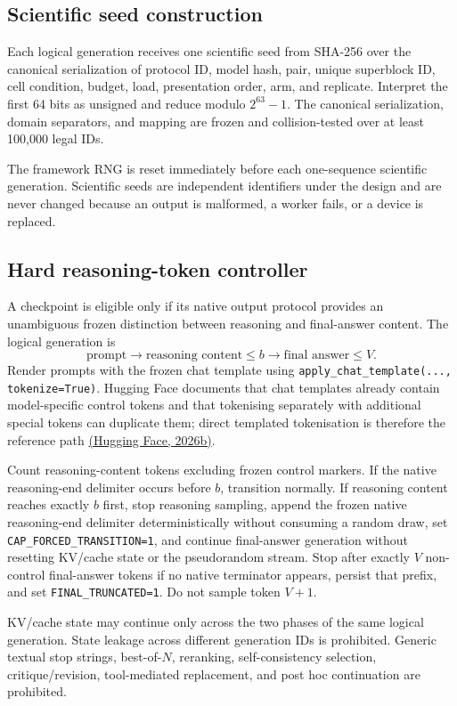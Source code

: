 \documentclass[11pt,a4paper]{article}
\begin{document}
\subsection{Scientific seed construction}
Each logical generation receives one scientific seed from SHA-256 over the canonical serialization of protocol ID, model hash, pair, unique superblock ID, cell condition, budget, load, presentation order, arm, and replicate. Interpret the first 64 bits as unsigned and reduce modulo $2^{63}-1$. The canonical serialization, domain separators, and mapping are frozen and collision-tested over at least 100,000 legal IDs.

The framework RNG is reset immediately before each one-sequence scientific generation. Scientific seeds are independent identifiers under the design and are never changed because an output is malformed, a worker fails, or a device is replaced.

\subsection{Hard reasoning-token controller}
A checkpoint is eligible only if its native output protocol provides an unambiguous frozen distinction between reasoning and final-answer content. The logical generation is
\[
\text{prompt}\to \text{reasoning content}\le b\to \text{final answer}\le V.
\]
Render prompts with the frozen chat template using \texttt{apply\_chat\_template(..., tokenize=True)}. Hugging Face documents that chat templates already contain model-specific control tokens and that tokenising separately with additional special tokens can duplicate them; direct templated tokenisation is therefore the reference path \href{https://huggingface.co/docs/transformers/main/chat_templating}{(Hugging Face, 2026b)}.

Count reasoning-content tokens excluding frozen control markers. If the native reasoning-end delimiter occurs before $b$, transition normally. If reasoning content reaches exactly $b$ first, stop reasoning sampling, append the frozen native reasoning-end delimiter deterministically without consuming a random draw, set \texttt{CAP\_FORCED\_TRANSITION=1}, and continue final-answer generation without resetting KV/cache state or the pseudorandom stream. Stop after exactly $V$ non-control final-answer tokens if no native terminator appears, persist that prefix, and set \texttt{FINAL\_TRUNCATED=1}. Do not sample token $V+1$.

KV/cache state may continue only across the two phases of the same logical generation. State leakage across different generation IDs is prohibited. Generic textual stop strings, best-of-$N$, reranking, self-consistency selection, critique/revision, tool-mediated replacement, and post hoc continuation are prohibited.
\end{document}
